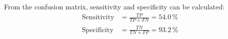 From the confusion matrix, sensitivity and specificity can be calculated:
\begin{align}
\text{Sensitivity} &= \frac{TP}{TP + FN} = 54.0\,\%\\
\text{Specificity}    &= \frac{TN}{TN + FP} = 93.2\,\%\\
\end{align}


